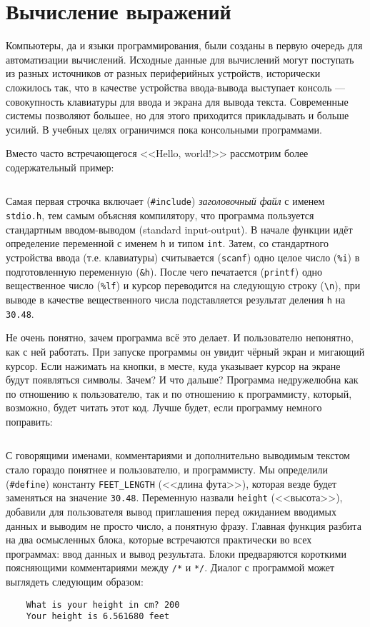 \section{Вычисление выражений}

Компьютеры, да и языки программирования, были созданы в первую очередь для
автоматизации вычислений. Исходные данные для вычислений могут поступать из
разных источников от разных периферийных устройств, исторически сложилось так,
что в качестве устройства ввода-вывода выступает консоль --- совокупность
клавиатуры для ввода и экрана для вывода текста. Современные системы позволяют
большее, но для этого приходится прикладывать и больше усилий. В учебных целях
ограничимся пока консольными программами.

\zzneedspace
Вместо часто встречающегося <<Hello, world!>> рассмотрим более содержательный пример:
%
\inputminted{c}{samples/feet_bad.c}

Самая первая строчка включает (\texttt{\#include}) \textit{заголовочный файл} с
именем \texttt{stdio.h}, тем самым объясняя компилятору, что программа
пользуется стандартным вводом-выводом (standard input-output). В начале функции идёт определение
переменной с именем \texttt{h} и типом \texttt{int}. Затем, со стандартного устройства
ввода (т.е. клавиатуры) считывается (\texttt{scanf}) одно целое число
(\texttt{\%i}) в подготовленную переменную (\texttt{\&h}). После чего печатается
(\texttt{printf}) одно вещественное число (\texttt{\%lf}) и курсор переводится
на следующую строку (\verb|\n|), при выводе в качестве вещественного числа
подставляется результат деления \texttt{h} на \texttt{30.48}.

Не очень понятно, зачем программа всё это делает. И пользователю
непонятно, как с ней работать. При запуске программы он увидит чёрный экран и
мигающий курсор. Если нажимать на кнопки, в месте, куда указывает курсор на
экране будут появляться символы. Зачем? И что дальше? Программа недружелюбна
как по отношению к пользователю, так и по отношению к программисту, который,
возможно, будет читать этот код. Лучше будет, если программу немного
поправить:
%
\inputminted{c}{samples/feet.c}

С говорящими именами, комментариями и дополнительно выводимым текстом стало
гораздо понятнее и пользователю, и программисту. Мы определили
(\texttt{\#define}) константу \texttt{FEET\_LENGTH} (<<длина фута>>), которая везде
будет заменяться на значение \texttt{30.48}. Переменную назвали \texttt{height}
(<<высота>>), добавили для пользователя вывод приглашения перед ожиданием
вводимых данных и выводим не просто число, а понятную фразу. Главная функция
разбита на два осмысленных блока, которые встречаются практически во всех
программах: ввод данных и вывод результата. Блоки предваряются короткими
поясняющими комментариями между \verb|/*| и \verb|*/|. Диалог с программой
может выглядеть следующим образом:
%
\begin{verbatim}
    What is your height in cm? 200
    Your height is 6.561680 feet
\end{verbatim}

